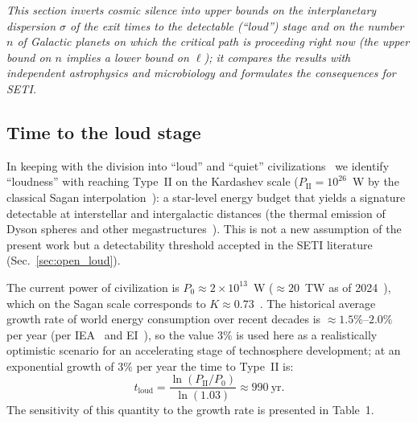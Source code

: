 \documentclass[11pt,a4paper]{article}
\begin{document}
\textit{This section inverts cosmic silence into \emph{upper bounds} on the interplanetary dispersion $\sigma$ of the exit times to the detectable (``loud'') stage and on the number $n$ of Galactic planets on which the critical path is proceeding right now (the upper bound on $n$ implies a lower bound on $\ell$); it compares the results with independent astrophysics and microbiology and formulates the consequences for SETI.}

\subsection{Time to the loud stage}
\label{sec:loud_time}

In keeping with the division into ``loud'' and ``quiet'' civilizations~\cite{Hanson2021} we identify ``loudness'' with reaching Type~II on the Kardashev scale ($P_{\mathrm{II}} = 10^{26}$~W by the classical Sagan interpolation~\cite{Kardashev1964,Sagan1973}): a star-level energy budget that yields a signature detectable at interstellar and intergalactic distances (the thermal emission of Dyson spheres and other megastructures~\cite{Dyson1960,Wright2014}). This is not a new assumption of the present work but a detectability threshold accepted in the SETI literature (Sec.~\ref{sec:open_loud}).

The current power of civilization is $P_0 \approx 2 \times 10^{13}$~W ($\approx 20$~TW as of 2024~\cite{EI2024}), which on the Sagan scale corresponds to $K \approx 0.73$~\cite{Sagan1973,Zhang2023}. The historical average growth rate of world energy consumption over recent decades is $\approx 1.5\%$--$2.0\%$ per year (per IEA~\cite{IEA2023} and EI~\cite{EI2024}), so the value $3\%$ is used here as a realistically optimistic scenario for an accelerating stage of technosphere development; at an exponential growth of $3\%$ per year the time to Type~II is:
\begin{equation}
t_{\mathrm{loud}} = \frac{\ln(P_{\mathrm{II}}/P_0)}{\ln(1.03)} \approx 990~\text{yr}.
\end{equation}
The sensitivity of this quantity to the growth rate is presented in Table~1.
\end{document}
